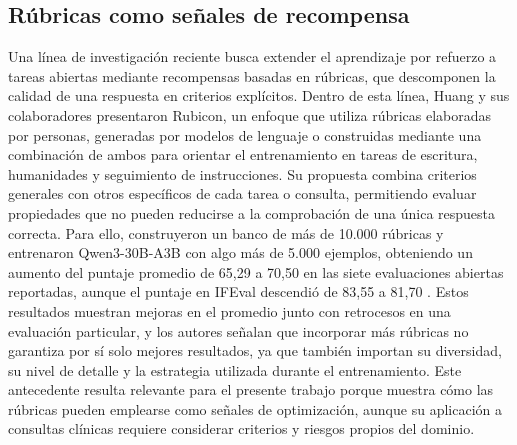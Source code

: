 \subsection{Rúbricas como señales de recompensa}
Una línea de investigación reciente busca extender el aprendizaje por refuerzo a tareas abiertas mediante recompensas basadas en rúbricas, que descomponen la calidad de una respuesta en criterios explícitos. Dentro de esta línea, Huang y sus colaboradores presentaron Rubicon, un enfoque que utiliza rúbricas elaboradas por personas, generadas por modelos de lenguaje o construidas mediante una combinación de ambos para orientar el entrenamiento en tareas de escritura, humanidades y seguimiento de instrucciones. Su propuesta combina criterios generales con otros específicos de cada tarea o consulta, permitiendo evaluar propiedades que no pueden reducirse a la comprobación de una única respuesta correcta. Para ello, construyeron un banco de más de 10.000 rúbricas y entrenaron Qwen3-30B-A3B con algo más de 5.000 ejemplos, obteniendo un aumento del puntaje promedio de 65,29 a 70,50 en las siete evaluaciones abiertas reportadas, aunque el puntaje en IFEval descendió de 83,55 a 81,70 \cite{huang2025rubicon}. Estos resultados muestran mejoras en el promedio junto con retrocesos en una evaluación particular, y los autores señalan que incorporar más rúbricas no garantiza por sí solo mejores resultados, ya que también importan su diversidad, su nivel de detalle y la estrategia utilizada durante el entrenamiento. Este antecedente resulta relevante para el presente trabajo porque muestra cómo las rúbricas pueden emplearse como señales de optimización, aunque su aplicación a consultas clínicas requiere considerar criterios y riesgos propios del dominio.

